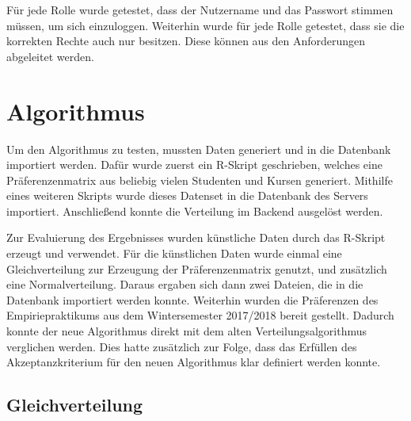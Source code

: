 			Für jede Rolle wurde getestet, dass der Nutzername und das Passwort stimmen müssen, um sich einzuloggen.
			Weiterhin wurde für jede Rolle getestet, dass sie die korrekten Rechte auch nur besitzen.\newline
			Diese können aus den Anforderungen abgeleitet werden.
	
	\section{Algorithmus}
	
		Um den Algorithmus zu testen, mussten Daten generiert und in die Datenbank importiert werden.
		Dafür wurde zuerst ein R-Skript geschrieben, welches eine Präferenzenmatrix aus beliebig vielen Studenten und Kursen generiert.
		Mithilfe eines weiteren Skripts wurde dieses Datenset in die Datenbank des Servers importiert.
		Anschließend konnte die Verteilung im Backend ausgelöst werden.\newline
		
		Zur Evaluierung des Ergebnisses wurden künstliche Daten durch das R-Skript erzeugt und verwendet.
		Für die künstlichen Daten wurde einmal eine Gleichverteilung zur Erzeugung der Präferenzenmatrix genutzt, und zusätzlich eine Normalverteilung.
		Daraus ergaben sich dann zwei Dateien, die in die Datenbank importiert werden konnte.\newline
		Weiterhin wurden die Präferenzen des Empiriepraktikums aus dem Wintersemester 2017/2018 bereit gestellt.
		Dadurch konnte der neue Algorithmus direkt mit dem alten Verteilungsalgorithmus verglichen werden.
		Dies hatte zusätzlich zur Folge, dass das Erfüllen des Akzeptanzkriterium für den neuen Algorithmus klar definiert werden konnte.
		
		\subsection{Gleichverteilung}
	
